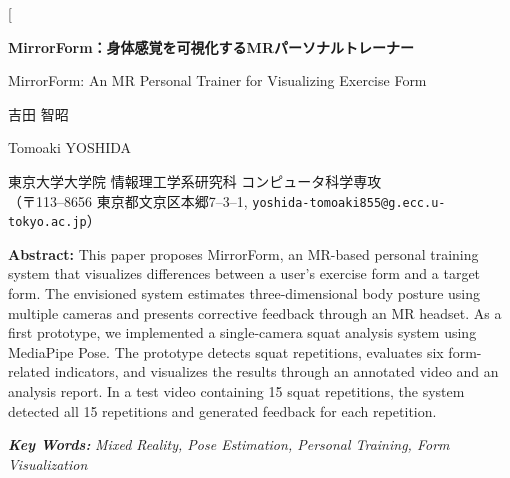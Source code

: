 \documentclass[a4paper,9pt,twocolumn]{jsarticle}
\begin{document}
\twocolumn[
\begin{center}

\vspace*{-8mm}

{\gtfamily\fontsize{18pt}{22pt}\selectfont\bfseries
MirrorForm：身体感覚を可視化するMRパーソナルトレーナー
\par}

\vspace{1\baselineskip}

{\rmfamily\fontsize{10pt}{12pt}\selectfont
MirrorForm: An MR Personal Trainer for Visualizing Exercise Form
\par}

\vspace{1\baselineskip}

{\mcfamily\fontsize{10pt}{12pt}\selectfont
吉田 智昭
\par}

{\rmfamily\fontsize{10pt}{12pt}\selectfont
Tomoaki YOSHIDA
\par}

\vspace{1\baselineskip}

{\mcfamily\fontsize{9pt}{11pt}\selectfont
東京大学大学院 情報理工学系研究科 コンピュータ科学専攻\\
（〒113--8656 東京都文京区本郷7--3--1,
\texttt{yoshida-tomoaki855@g.ecc.u-tokyo.ac.jp}）
\par}

\vspace{1\baselineskip}

\begin{minipage}{\dimexpr\textwidth-10zw\relax}
\rmfamily\fontsize{9pt}{11pt}\selectfont
\textbf{Abstract:}
This paper proposes MirrorForm, an MR-based personal training system that visualizes differences between a user's exercise form and a target form.
The envisioned system estimates three-dimensional body posture using multiple cameras and presents corrective feedback through an MR headset.
As a first prototype, we implemented a single-camera squat analysis system using MediaPipe Pose.
The prototype detects squat repetitions, evaluates six form-related indicators, and visualizes the results through an annotated video and an analysis report.
In a test video containing 15 squat repetitions, the system detected all 15 repetitions and generated feedback for each repetition.

\medskip
\textbf{\textit{Key Words:}}
\textit{Mixed Reality, Pose Estimation, Personal Training, Form Visualization}
\end{minipage}

\end{center}
\end{document}

